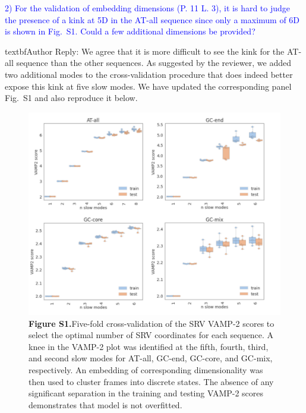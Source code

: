 \documentclass[11pt,a4paper]{letter} %
\begin{document}
\textcolor{blue}{2)      For the validation of embedding dimensions (P. 11 L. 3), it is hard to judge the presence of a kink at 5D in the AT-all sequence since only a maximum of 6D is shown in Fig.~S1. Could a few additional dimensions be provided?}

textbf{Author Reply:}   We agree that it is more difficult to see the kink for the AT-all sequence than the other sequences. As suggested by the reviewer, we added two additional modes to the cross-validation procedure that does indeed better expose this kink at five slow modes. We have updated the corresponding panel Fig.~S1 and also reproduce it below.

\begin{figure}[ht!]
	\begin{center}
        \includegraphics[width=1.0\textwidth]{FigS1.pdf}
         \caption*{\textbf{Figure S1.}Five-fold cross-validation of the SRV VAMP-2 scores to select the optimal number of SRV coordinates for each sequence. A knee in the VAMP-2 plot was identified at the fifth, fourth, third, and second slow modes for AT-all, GC-end, GC-core, and GC-mix, respectively. An embedding of corresponding dimensionality was then used to cluster frames into discrete states. The absence of any significant separation in the training and testing VAMP-2 scores demonstrates that model is not overfitted.}
        \label{fig:SIFig1}
	\end{center}
\end{figure}
\end{document}
